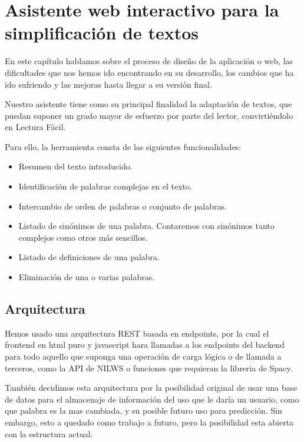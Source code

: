 \chapter{Asistente web interactivo para la simplificación de textos}
\label{cap:asistente}


En este capítulo hablamos sobre el proceso de diseño de la aplicación o web, las dificultades que nos hemos ido encontrando en su desarrollo, los cambios que ha ido sufriendo y las mejoras hasta llegar a su versión final.

Nuestro asistente tiene como su principal finalidad la adaptación de textos, que puedan suponer un grado mayor de esfuerzo por parte del lector, convirtiéndolo en Lectura Fácil.

Para ello, la herramienta consta de las siguientes funcionalidades:
\begin{itemize}
\item Resumen del texto introducido.
\item Identificación de palabras complejas en el texto.
\item Intercambio de orden de palabras o conjunto de palabras.
\item Listado de sinónimos de una palabra. Contaremos con sinónimos tanto complejos como otros más sencillos.
\item Listado de definiciones de una palabra.
\item Eliminación de una o varias palabras.
\end{itemize}
\section{Arquitectura}\label{sec:arquitectura}

Hemos usado una arquitectura REST basada en endpoints, por la cual el frontend en html puro y javascript hara llamadas a los endpoints del backend para todo aquello que suponga una operación de carga lógica o de llamada a terceros, como la API de NILWS o funciones que requieran la libreria de Spacy.

También decidimos esta arquitectura por la posibilidad original de usar una base de datos para el almacenaje de información del uso que le daría un usuario, como que palabra es la mas cambiada, y su posible futuro uso para predicción. Sin embargo, esto a quedado como trabajo a futuro, pero la posibilidad esta abierta con la estructura actual.

